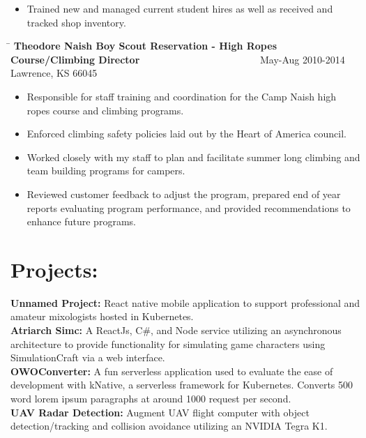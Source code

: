 \documentclass{res}
\begin{document}
\begin{resume}
\begin{changemargin}{-0.25in}{0in}
\begin{itemize}
		\item Trained new and managed current student hires as well as received and tracked shop inventory.\vspace{-15pt}
	\end{itemize}
	\vspace{0.2in}
   \begin{tabbing}
	\hspace{5.5in}\= \kill
	{\bf Theodore Naish Boy Scout Reservation - High Ropes Course/Climbing Director}  \>~~~~~~~~~~~~~~~~~~~~~~~~May-Aug 2010-2014\\
	Lawrence, KS 66045
	\end{tabbing}\vspace{-1pt}
    \begin{itemize}
		\item Responsible for staff training and coordination for the Camp Naish high ropes course and climbing programs.
		\item Enforced climbing safety policies laid out by the Heart of America council.
		\item Worked closely with my staff to plan and facilitate summer long climbing and team building programs for campers.
		\item Reviewed customer feedback to adjust the program, prepared end of year reports evaluating program performance, and provided recommendations to enhance future programs.\vspace{-15pt}
	\end{itemize}
	\end{changemargin}
\section{Projects:}       
{
	\begin{changemargin}{-0.25in}{0in}
	\textbf{Unnamed Project:} React native mobile application to support professional and amateur mixologists hosted in Kubernetes.\\
	\textbf{Atriarch Simc:} A ReactJs, C\#, and Node service utilizing an asynchronous architecture to provide functionality for simulating game characters using SimulationCraft via a web interface.\\
	\textbf{OWOConverter:} A fun serverless application used to evaluate the ease of development with kNative, a serverless framework for Kubernetes. Converts 500 word lorem ipsum paragraphs at around 1000 request per second.\\
	\textbf{UAV Radar Detection:} Augment UAV flight computer with object detection/tracking and collision avoidance utilizing an NVIDIA Tegra K1.\\
	\end{changemargin}
}
\end{resume}
\end{document}

